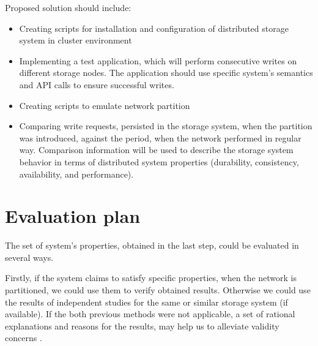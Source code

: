 \documentclass[a4paper]{article}
\begin{document}
Proposed solution should include:
\begin{itemize}
	\item Creating scripts for installation and configuration of distributed storage system in cluster environment
	\item Implementing a test application, which will perform consecutive writes on different storage nodes. The application should use specific system's semantics and API calls to ensure successful writes.
	\item Creating scripts to emulate network partition  
	\item Comparing write requests, persisted in the storage system, when the partition was introduced, against the period, when the network performed in regular way. Comparison information will be used to describe the storage system behavior in terms of distributed system properties (durability, consistency, availability, and performance).
\end{itemize}

\section*{Evaluation plan}

The set of system's properties, obtained in the last step, could be evaluated in several ways.

Firstly, if the system claims to satisfy specific properties, when the network is partitioned, we could use them to verify obtained results.
Otherwise we could use the results of independent studies for the same or similar storage system (if available). If the both previous methods were not applicable, a set of rational explanations and reasons for the results, may help us to alleviate validity concerns  \cite{jepsen}. 

\printbibliography
\end{document}
